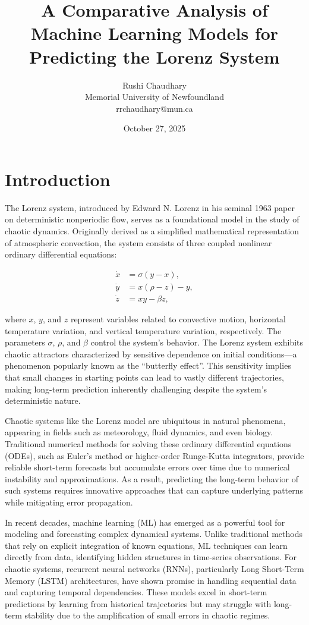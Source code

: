 \documentclass[12pt]{article}
\title{A Comparative Analysis of Machine Learning Models for Predicting the Lorenz System}
\author{Rushi Chaudhary \\
Memorial University of Newfoundland \\
rrchaudhary@mun.ca}
\date{October 27, 2025}
\begin{document}
\maketitle

\section{Introduction}

The Lorenz system, introduced by Edward N. Lorenz in his seminal 1963 paper on deterministic nonperiodic flow, serves as a foundational model in the study of chaotic dynamics. Originally derived as a simplified mathematical representation of atmospheric convection, the system consists of three coupled nonlinear ordinary differential equations:

\begin{align}
\dot{x} &= \sigma (y - x), \\
\dot{y} &= x (\rho - z) - y, \\
\dot{z} &= xy - \beta z,
\end{align}

where $x$, $y$, and $z$ represent variables related to convective motion, horizontal temperature variation, and vertical temperature variation, respectively. The parameters $\sigma$, $\rho$, and $\beta$ control the system's behavior. The Lorenz system exhibits chaotic attractors characterized by sensitive dependence on initial conditions—a phenomenon popularly known as the ``butterfly effect''. This sensitivity implies that small changes in starting points can lead to vastly different trajectories, making long-term prediction inherently challenging despite the system's deterministic nature.

Chaotic systems like the Lorenz model are ubiquitous in natural phenomena, appearing in fields such as meteorology, fluid dynamics, and even biology. Traditional numerical methods for solving these ordinary differential equations (ODEs), such as Euler's method or higher-order Runge-Kutta integrators, provide reliable short-term forecasts but accumulate errors over time due to numerical instability and approximations. As a result, predicting the long-term behavior of such systems requires innovative approaches that can capture underlying patterns while mitigating error propagation.

In recent decades, machine learning (ML) has emerged as a powerful tool for modeling and forecasting complex dynamical systems. Unlike traditional methods that rely on explicit integration of known equations, ML techniques can learn directly from data, identifying hidden structures in time-series observations. For chaotic systems, recurrent neural networks (RNNs), particularly Long Short-Term Memory (LSTM) architectures, have shown promise in handling sequential data and capturing temporal dependencies. These models excel in short-term predictions by learning from historical trajectories but may struggle with long-term stability due to the amplification of small errors in chaotic regimes.
\end{document}
